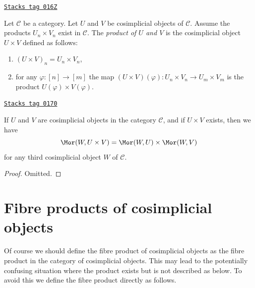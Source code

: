 \begin{definition}
\label{simplicial-definition-product-cosimplicial-objects}
\href{https://stacks.math.columbia.edu/tag/016Z}{\texttt{Stacks tag 016Z}}

Let $\mathcal{C}$ be a category.
Let $U$ and $V$ be cosimplicial objects of $\mathcal{C}$.
Assume the products $U_n \times V_n$ exist in $\mathcal{C}$.
The {\it product of $U$ and $V$} is the cosimplicial object
$U \times V$ defined as follows:
\begin{enumerate}
\item $(U \times V)_n = U_n \times V_n$,
\item for any $\varphi : [n] \to [m]$ the map
$(U \times V)(\varphi) : U_n \times V_n \to U_m \times V_m$
is the product $U(\varphi) \times V(\varphi)$.
\end{enumerate}
\end{definition}

\begin{lemma}
\label{simplicial-lemma-product-cosimplicial-objects}
\href{https://stacks.math.columbia.edu/tag/0170}{\texttt{Stacks tag 0170}}

If $U$ and $V$ are cosimplicial objects in the category $\mathcal{C}$,
and if $U \times V$ exists, then we have
$$
\Mor(W, U \times V) =
\Mor(W, U) \times
\Mor(W, V)
$$
for any third cosimplicial object $W$ of $\mathcal{C}$.
\end{lemma}

\begin{proof}
Omitted.
\end{proof}

\section{Fibre products of cosimplicial objects}
\label{simplicial-section-fibre-products-cosimplicial}
Of course we should define the fibre product of cosimplicial objects
as the fibre product in the category of cosimplicial objects. This
may lead to the potentially confusing situation where the product exists
but is not described as below. To avoid this we define the fibre product
directly as follows.

